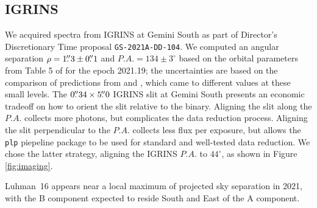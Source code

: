 \documentclass[modern]{aastex631}
\begin{document}
\subsection{IGRINS}
We acquired spectra from IGRINS \citep{park14,2018SPIE10702E..0QM} at Gemini South as part of Director's Discretionary Time proposal \texttt{GS-2021A-DD-104}.  We computed an angular separation $\rho = 1\mbox{$.\!\!^{\prime\prime}$}3 \pm 0 \mbox{$.\!\!^{\prime\prime}$} 1$ and $P.A. = 134 \pm 3^\circ$ based on the orbital parameters from Table 5 of \citet{2018A&A...618A.111L} for the epoch 2021.19; the uncertainties are based on the comparison of predictions from \citet{2017MNRAS.470.1140B} and \citet{2018A&A...618A.111L}, which came to different values at these small levels.  The $0\mbox{$.\!\!^{\prime\prime}$}34 \times 5\mbox{$.\!\!^{\prime\prime}$}0$ IGRINS slit at Gemini South presents an economic tradeoff on how to orient the slit relative to the binary.  Aligning the slit along the $P.A.$ collects more photons, but complicates the data reduction process.  Aligning the slit perpendicular to the $P.A.$ collects less flux per exposure, but allows the \texttt{plp} piepeline package \citep{jaejoonlee16} to be used for standard and well-tested data reduction.  We chose the latter strategy, aligning the IGRINS $P.A.$ to $44^\circ$, as shown in Figure \ref{fig:imaging}.



Luhman~16 appears near a local maximum of projected sky separation in 2021, with the B component expected to reside South and East of the A component.
\end{document}
